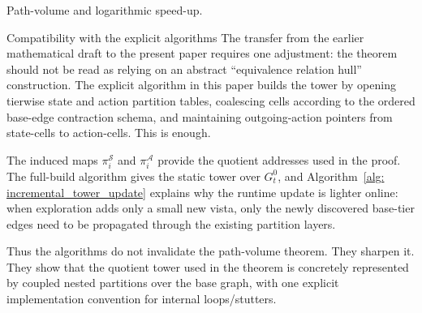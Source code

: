 \documentclass[11pt]{article}
\begin{document}
\begin{section}{Path-volume and logarithmic speed-up.}
\begin{subsection}{Compatibility with the explicit algorithms}
The transfer from the earlier mathematical draft to the present paper requires one adjustment: the theorem should not be read as relying on an abstract ``equivalence relation hull'' construction. The explicit algorithm in this paper builds the tower by opening tierwise state and action partition tables, coalescing cells according to the ordered base-edge contraction schema, and maintaining outgoing-action pointers from state-cells to action-cells. This is enough.

The induced maps
$
\pi_i^{\mathcal S}
$
and
$
\pi_i^{\mathcal A}
$
provide the quotient addresses used in the proof. The full-build algorithm gives the static tower over $G_t^0$, and Algorithm~\ref{alg: incremental_tower_update} explains why the runtime update is lighter online: when exploration adds only a small new vista, only the newly discovered base-tier edges need to be propagated through the existing partition layers.

Thus the algorithms do not invalidate the path-volume theorem. They sharpen it. They show that the quotient tower used in the theorem is concretely represented by coupled nested partitions over the base graph, with one explicit implementation convention for internal loops/stutters.

\end{subsection}
\end{section}

\appendix
\end{document}
